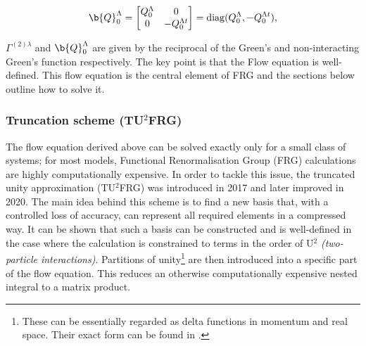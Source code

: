 \documentclass[12pt]{article}
\begin{document}
\begin{equation}\label{Q0 term }
\b{Q}_0^{\Lambda} =
\begin{bmatrix}
Q_0^{\Lambda} & 0 \\
0 & -Q_0^{\Lambda t}
\end{bmatrix}
= \mathrm{diag}(Q_0^{\Lambda}, - Q_0^{\Lambda t}),
\end{equation}

\noindent $\Gamma^{(2)\lambda}$ and $\b{Q}_0^{\Lambda}$ are given by the reciprocal 
of the Green's and non-interacting Green's function respectively.
The key point is that the Flow equation is well-defined. 
This flow equation is the central element of FRG and the sections below outline how to solve it.


\subsubsection{Truncation scheme (TU$^2$FRG)}
\label{subsubsec:Truncation scheme}


The flow equation derived above can be solved exactly only for a small class of systems; for most models, Functional Renormalisation Group (FRG) 
calculations are highly computationally expensive.
In order to tackle this issue, the truncated unity approximation (TU$^2$FRG) was introduced in 2017\cite{lichtenstein2017high} and later improved in 2020\cite{eckhardt2020truncated}. 
The main idea behind this scheme is to find a new basis that, with a controlled loss of accuracy, can represent all 
required elements in a compressed way. It can be shown that such a basis can be constructed and is 
well-defined in the case where the calculation is constrained to terms in the order of U$^{2}$ \textit{(two-particle interactions)}\cite{lichtenstein2018functional}.
Partitions of unity\footnote{These can be essentially regarded as delta functions in momentum and real space. Their exact form can be found in \cite{lichtenstein2018functional}.} are then introduced into a specific part of the flow equation. This reduces an otherwise computationally expensive nested integral to a matrix product.\par
\medskip
\end{document}
